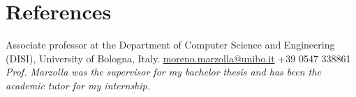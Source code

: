 \documentclass[curriculum-vitae-eng]{subfiles}
\begin{document}
	\section*{References}
	
	{Associate professor at the Department of Computer Science and Engineering (DISI), University of Bologna, Italy.}
	{\href{mailto:moreno.marzolla@unibo.it}{moreno.marzolla@unibo.it}}
	{+39 0547 338861}
	{}
	{\textit{Prof. Marzolla was the supervisor for my bachelor thesis and has been the academic tutor for my internship.}}
\end{document}
